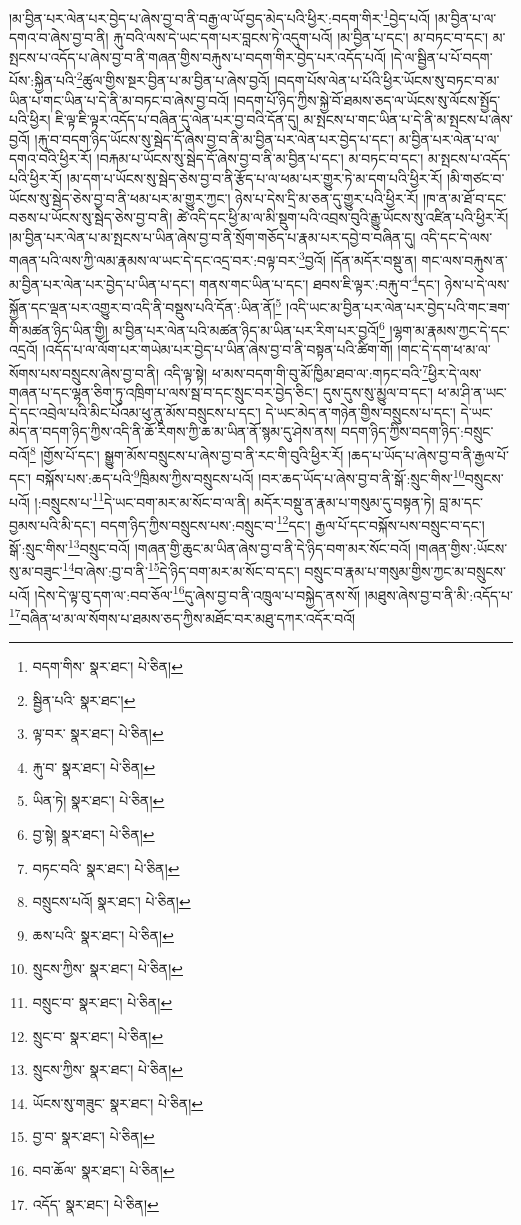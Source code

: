 །མ་བྱིན་པར་ལེན་པར་བྱེད་པ་ཞེས་བྱ་བ་ནི་བརྒྱ་ལ་ཡོ་བྱད་མེད་པའི་ཕྱིར་:བདག་གིར་\footnote{བདག་གིས་  སྣར་ཐང་།  པེ་ཅིན། }བྱེད་པའོ། །མ་བྱིན་པ་ལ་དགའ་བ་ཞེས་བྱ་བ་ནི། རྐུ་བའི་ལས་དེ་ཡང་དག་པར་བླངས་ཏེ་འདུག་པའོ། །མ་བྱིན་པ་དང་། མ་བཏང་བ་དང་། མ་སྤངས་པ་འདོད་པ་ཞེས་བྱ་བ་ནི་གཞན་གྱིས་བརྐུས་པ་བདག་གིར་བྱེད་པར་འདོད་པའོ། །དེ་ལ་སྦྱིན་པ་པོ་བདག་པོས་:སྐྱིན་པའི་\footnote{སྦྱིན་པའི་  སྣར་ཐང་། }ཚུལ་གྱིས་སྔར་བྱིན་པ་མ་བྱིན་པ་ཞེས་བྱའོ། །བདག་པོས་ལེན་པ་པོའི་ཕྱིར་ཡོངས་སུ་བཏང་བ་མ་ཡིན་པ་གང་ཡིན་པ་དེ་ནི་མ་བཏང་བ་ཞེས་བྱ་བའོ། །བདག་པོ་ཉིད་ཀྱིས་སྐྱེ་བོ་ཐམས་ཅད་ལ་ཡོངས་སུ་ལོངས་སྤྱོད་པའི་ཕྱིར། ཇི་ལྟ་ཇི་ལྟར་འདོད་པ་བཞིན་དུ་ལེན་པར་བྱ་བའི་དོན་དུ། མ་སྤངས་པ་གང་ཡིན་པ་དེ་ནི་མ་སྤངས་པ་ཞེས་བྱའོ། །རྐུ་བ་བདག་ཉིད་ཡོངས་སུ་སྦེད་དོ་ཞེས་བྱ་བ་ནི་མ་བྱིན་པར་ལེན་པར་བྱེད་པ་དང་། མ་བྱིན་པར་ལེན་པ་ལ་དགའ་བའི་ཕྱིར་རོ། །བརྐམ་པ་ཡོངས་སུ་སྦེད་དོ་ཞེས་བྱ་བ་ནི་མ་བྱིན་པ་དང་། མ་བཏང་བ་དང་། མ་སྤངས་པ་འདོད་པའི་ཕྱིར་རོ། །མ་དག་པ་ཡོངས་སུ་སྦེད་ཅེས་བྱ་བ་ནི་རྩོད་པ་ལ་ཕམ་པར་གྱུར་ཏེ་མ་དག་པའི་ཕྱིར་རོ། །མི་གཙང་བ་ཡོངས་སུ་སྦེད་ཅེས་བྱ་བ་ནི་ཕམ་པར་མ་གྱུར་ཀྱང་། ཉེས་པ་དེས་དྲི་མ་ཅན་དུ་གྱུར་པའི་ཕྱིར་རོ། །ཁ་ན་མ་ཐོ་བ་དང་བཅས་པ་ཡོངས་སུ་སྦེད་ཅེས་བྱ་བ་ནི། ཚེ་འདི་དང་ཕྱི་མ་ལ་མི་སྡུག་པའི་འབྲས་བུའི་རྒྱུ་ཡོངས་སུ་འཛིན་པའི་ཕྱིར་རོ། །མ་བྱིན་པར་ལེན་པ་མ་སྤངས་པ་ཡིན་ཞེས་བྱ་བ་ནི་སྲོག་གཅོད་པ་རྣམ་པར་དབྱེ་བ་བཞིན་དུ། འདི་དང་དེ་ལས་གཞན་པའི་ལས་ཀྱི་ལམ་རྣམས་ལ་ཡང་དེ་དང་འདྲ་བར་:བལྟ་བར་\footnote{ལྟ་བར་  སྣར་ཐང་།  པེ་ཅིན། }བྱའོ། །དོན་མདོར་བསྡུ་ན། གང་ལས་བརྐུས་ན་མ་བྱིན་པར་ལེན་པར་བྱེད་པ་ཡིན་པ་དང་། གནས་གང་ཡིན་པ་དང་། ཐབས་ཇི་ལྟར་:བརྐུ་བ་\footnote{རྐུ་བ་  སྣར་ཐང་།  པེ་ཅིན། }དང་། ཉེས་པ་དེ་ལས་སྐྱོན་དང་ལྡན་པར་འགྱུར་བ་འདི་ནི་བསྡུས་པའི་དོན་:ཡིན་ནོ།\footnote{ཡིན་ཏེ།  སྣར་ཐང་།  པེ་ཅིན། } །འདི་ཡང་མ་བྱིན་པར་ལེན་པར་བྱེད་པའི་གང་ཟག་གི་མཚན་ཉིད་ཡིན་གྱི། མ་བྱིན་པར་ལེན་པའི་མཚན་ཉིད་མ་ཡིན་པར་རིག་པར་བྱའོ།\footnote{བྱ་སྟེ།  སྣར་ཐང་།  པེ་ཅིན། } །ལྷག་མ་རྣམས་ཀྱང་དེ་དང་འདྲའོ། །འདོད་པ་ལ་ལོག་པར་གཡེམ་པར་བྱེད་པ་ཡིན་ཞེས་བྱ་བ་ནི་བསྟན་པའི་ཚིག་གོ། །གང་དེ་དག་ཕ་མ་ལ་སོགས་པས་བསྲུངས་ཞེས་བྱ་བ་ནི། འདི་ལྟ་སྟེ། ཕ་མས་བདག་གི་བུ་མོ་ཁྱིམ་ཐབ་ལ་:གཏང་བའི་\footnote{བཏང་བའི་  སྣར་ཐང་།  པེ་ཅིན། }ཕྱིར་དེ་ལས་གཞན་པ་དང་ལྷན་ཅིག་ཏུ་འཁྲིག་པ་ལས་སྦ་བ་དང་སྲུང་བར་བྱེད་ཅིང་། དུས་དུས་སུ་མྱུལ་བ་དང་། ཕ་མ་ཤི་ན་ཡང་དེ་དང་འབྲེལ་པའི་མིང་པོའམ་ཕུ་ནུ་མོས་བསྲུངས་པ་དང་། དེ་ཡང་མེད་ན་གཉེན་གྱིས་བསྲུངས་པ་དང་། དེ་ཡང་མེད་ན་བདག་ཉིད་ཀྱིས་འདི་ནི་ཆོ་རིགས་ཀྱི་ཆ་མ་ཡིན་ནོ་སྙམ་དུ་ཤེས་ནས། བདག་ཉིད་ཀྱིས་བདག་ཉིད་:བསྲུང་བའོ།\footnote{བསྲུངས་པའོ།  སྣར་ཐང་།  པེ་ཅིན། } །གྱོས་པོ་དང་། སྒྱུག་མོས་བསྲུངས་པ་ཞེས་བྱ་བ་ནི་རང་གི་བུའི་ཕྱིར་རོ། །ཆད་པ་ཡོད་པ་ཞེས་བྱ་བ་ནི་རྒྱལ་པོ་དང་། བསྐོས་པས་:ཆད་པའི་\footnote{ཆས་པའི་  སྣར་ཐང་།  པེ་ཅིན། }ཁྲིམས་ཀྱིས་བསྲུངས་པའོ། །བར་ཆད་ཡོད་པ་ཞེས་བྱ་བ་ནི་སྒོ་:སྲུང་གིས་\footnote{སྲུངས་ཀྱིས་  སྣར་ཐང་།  པེ་ཅིན། }བསྲུངས་པའོ། །:བསྲུངས་པ་\footnote{བསྲུང་བ་  སྣར་ཐང་།  པེ་ཅིན། }དེ་ཡང་བག་མར་མ་སོང་བ་ལ་ནི། མདོར་བསྡུ་ན་རྣམ་པ་གསུམ་དུ་བསྟན་ཏེ། བླ་མ་དང་བྱམས་པའི་མི་དང་། བདག་ཉིད་ཀྱིས་བསྲུངས་པས་:བསྲུང་བ་\footnote{སྲུང་བ་  སྣར་ཐང་།  པེ་ཅིན། }དང་། རྒྱལ་པོ་དང་བསྐོས་པས་བསྲུང་བ་དང་། སྒོ་:སྲུང་གིས་\footnote{སྲུངས་ཀྱིས་  སྣར་ཐང་།  པེ་ཅིན། }བསྲུང་བའོ། །གཞན་གྱི་ཆུང་མ་ཡིན་ཞེས་བྱ་བ་ནི་དེ་ཉིད་བག་མར་སོང་བའོ། །གཞན་གྱིས་:ཡོངས་སུ་མ་བཟུང་\footnote{ཡོངས་སུ་གཟུང་  སྣར་ཐང་།  པེ་ཅིན། }བ་ཞེས་:བྱ་བ་ནི་\footnote{བྱ་བ་  སྣར་ཐང་།  པེ་ཅིན། }དེ་ཉིད་བག་མར་མ་སོང་བ་དང་། བསྲུང་བ་རྣམ་པ་གསུམ་གྱིས་ཀྱང་མ་བསྲུངས་པའོ། །དེས་དེ་ལྟ་བུ་དག་ལ་:བབ་ཅོལ་\footnote{བབ་ཆོལ་  སྣར་ཐང་།  པེ་ཅིན། }དུ་ཞེས་བྱ་བ་ནི་འཁྲུལ་པ་བསྐྱེད་ནས་སོ། །མཐུས་ཞེས་བྱ་བ་ནི་མི་:འདོད་པ་\footnote{འདོད་  སྣར་ཐང་།  པེ་ཅིན། }བཞིན་ཕ་མ་ལ་སོགས་པ་ཐམས་ཅད་ཀྱིས་མཐོང་བར་མཐུ་དཀར་འདོར་བའོ། 